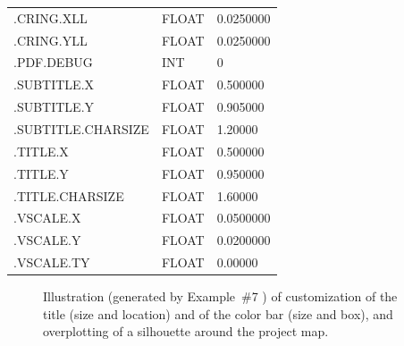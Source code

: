 \begin{examples}
{\begin{minipage}[t]{\hsize}
\begin{scriptsize}
{\begin{tabular}{lll}
.CRING.XLL              &     FLOAT     &      0.0250000\\
.CRING.YLL              &     FLOAT     &      0.0250000\\
.PDF.DEBUG              &     INT       &      0 \\
.SUBTITLE.X             &     FLOAT     &       0.500000\\
.SUBTITLE.Y             &     FLOAT     &       0.905000\\
.SUBTITLE.CHARSIZE      &     FLOAT     &        1.20000\\
.TITLE.X                &     FLOAT     &       0.500000\\
.TITLE.Y                &     FLOAT     &       0.950000\\
.TITLE.CHARSIZE         &     FLOAT     &        1.60000\\
.VSCALE.X               &     FLOAT     &      0.0500000\\
.VSCALE.Y               &     FLOAT     &      0.0200000\\
.VSCALE.TY              &     FLOAT     &        0.00000
\end{tabular}
}
\end{scriptsize}
\end{minipage}}

\end{examples}
%
\begin{figure}[h!]
\caption{%
\label{page:moll_customize}%
\label{fig:moll_customize}%
Illustration (generated by 
Example~\#7
) of customization of the title (size and location) and of the color bar (size and box), and overplotting of a silhouette around the project map.}
\end{figure}

